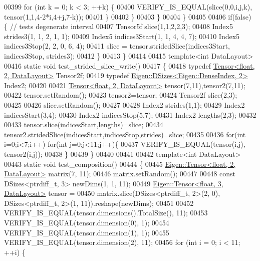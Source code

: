 \begin{DoxyCode}
00399         \textcolor{keywordflow}{for} (\textcolor{keywordtype}{int} k = 0; k < 3; ++k) \{
00400           VERIFY\_IS\_EQUAL(slice(0,0,i,j,k), tensor(1,1,4-2*i,4+j,7-k));
00401         \}
00402       \}
00403     \}
00404   \}
00405 
00406   \textcolor{keywordflow}{if}(\textcolor{keyword}{false}) \{ \textcolor{comment}{// tests degenerate interval}
00407     Tensor5f slice(1,1,2,2,3);
00408     Index5 strides3(1, 1, 2, 1, 1);
00409     Index5 indices3Start(1, 1, 4, 4, 7);
00410     Index5 indices3Stop(2, 2, 0, 6, 4);
00411     slice = tensor.stridedSlice(indices3Start, indices3Stop, strides3);
00412   \}
00413 \}
00414 
00415 \textcolor{keyword}{template}<\textcolor{keywordtype}{int} DataLayout>
00416 \textcolor{keyword}{static} \textcolor{keywordtype}{void} test\_strided\_slice\_write()
00417 \{
00418   \textcolor{keyword}{typedef} \hyperlink{class_eigen_1_1_tensor}{Tensor<float, 2, DataLayout>} Tensor2f;
00419   \textcolor{keyword}{typedef} \hyperlink{struct_eigen_1_1_d_sizes}{Eigen::DSizes<Eigen::DenseIndex, 2>} Index2;
00420 
00421   \hyperlink{class_eigen_1_1_tensor}{Tensor<float, 2, DataLayout>} tensor(7,11),tensor2(7,11);
00422   tensor.setRandom();
00423   tensor2=tensor;
00424   Tensor2f slice(2,3);
00425 
00426   slice.setRandom();
00427 
00428   Index2 strides(1,1);
00429   Index2 indicesStart(3,4);
00430   Index2 indicesStop(5,7);
00431   Index2 lengths(2,3);
00432 
00433   tensor.slice(indicesStart,lengths)=slice;
00434   tensor2.stridedSlice(indicesStart,indicesStop,strides)=slice;
00435 
00436   \textcolor{keywordflow}{for}(\textcolor{keywordtype}{int} i=0;i<7;i++) \textcolor{keywordflow}{for}(\textcolor{keywordtype}{int} j=0;j<11;j++)\{
00437     VERIFY\_IS\_EQUAL(tensor(i,j), tensor2(i,j));
00438   \}
00439 \}
00440 
00441 
00442 \textcolor{keyword}{template}<\textcolor{keywordtype}{int} DataLayout>
00443 \textcolor{keyword}{static} \textcolor{keywordtype}{void} test\_composition()
00444 \{
00445   \hyperlink{class_eigen_1_1_tensor}{Eigen::Tensor<float, 2, DataLayout>} matrix(7, 11);
00446   matrix.setRandom();
00447 
00448   \textcolor{keyword}{const} DSizes<ptrdiff\_t, 3> newDims(1, 1, 11);
00449   \hyperlink{class_eigen_1_1_tensor}{Eigen::Tensor<float, 3, DataLayout>} tensor =
00450       matrix.slice(DSizes<ptrdiff\_t, 2>(2, 0), DSizes<ptrdiff\_t, 2>(1, 11)).reshape(newDims);
00451 
00452   VERIFY\_IS\_EQUAL(tensor.dimensions().TotalSize(), 11);
00453   VERIFY\_IS\_EQUAL(tensor.dimension(0), 1);
00454   VERIFY\_IS\_EQUAL(tensor.dimension(1), 1);
00455   VERIFY\_IS\_EQUAL(tensor.dimension(2), 11);
00456   \textcolor{keywordflow}{for} (\textcolor{keywordtype}{int} i = 0; i < 11; ++i) \{

\end{DoxyCode}
